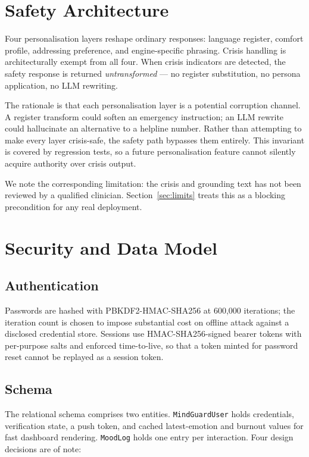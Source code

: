 \documentclass[runningheads]{llncs}
\begin{document}
\section{Safety Architecture}
\label{sec:safety}

Four personalisation layers reshape ordinary responses: language register,
comfort profile, addressing preference, and engine-specific phrasing. Crisis
handling is architecturally exempt from all four. When crisis indicators are
detected, the safety response is returned \emph{untransformed} --- no
register substitution, no persona application, no LLM rewriting.

The rationale is that each personalisation layer is a potential corruption
channel. A register transform could soften an emergency instruction; an LLM
rewrite could hallucinate an alternative to a helpline number. Rather than
attempting to make every layer crisis-safe, the safety path bypasses them
entirely. This invariant is covered by regression tests, so a future
personalisation feature cannot silently acquire authority over crisis output.

We note the corresponding limitation: the crisis and grounding text has not
been reviewed by a qualified clinician. Section~\ref{sec:limits} treats this
as a blocking precondition for any real deployment.

\section{Security and Data Model}

\subsection{Authentication}
Passwords are hashed with PBKDF2-HMAC-SHA256 \cite{pbkdf2} at 600{,}000
iterations; the iteration count is chosen to impose substantial cost on
offline attack against a disclosed credential store. Sessions use
HMAC-SHA256-signed bearer tokens with per-purpose salts and enforced
time-to-live, so that a token minted for password reset cannot be replayed as
a session token.

\subsection{Schema}
The relational schema comprises two entities. \texttt{MindGuardUser} holds
credentials, verification state, a push token, and cached latest-emotion and
burnout values for fast dashboard rendering. \texttt{MoodLog} holds one entry
per interaction. Four design decisions are of note:
\end{document}
